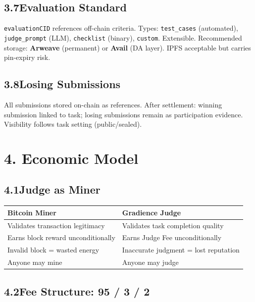 \documentclass[11pt,a4paper]{article}
\begin{document}
\subsection{3.7\quad Evaluation Standard}
\texttt{evaluationCID} references off-chain criteria. Types: \texttt{test\_cases} (automated), \texttt{judge\_prompt} (LLM), \texttt{checklist} (binary), \texttt{custom}. Extensible. Recommended storage: \textbf{Arweave} (permanent) or \textbf{Avail} (DA layer). IPFS acceptable but carries pin-expiry risk.

\subsection{3.8\quad Losing Submissions}
All submissions stored on-chain as references. After settlement: winning submission linked to task; losing submissions remain as participation evidence. Visibility follows task setting (public/sealed).

\section{4. Economic Model}

\subsection{4.1\quad Judge as Miner}

\begin{table}[H]\centering
\begin{tabular}{@{}ll@{}}
\toprule
\textbf{Bitcoin Miner} & \textbf{Gradience Judge} \\
\midrule
Validates transaction legitimacy & Validates task completion quality \\
Earns block reward unconditionally & Earns Judge Fee unconditionally \\
Invalid block = wasted energy & Inaccurate judgment = lost reputation \\
Anyone may mine & Anyone may judge \\
\bottomrule
\end{tabular}
\end{table}

\subsection{4.2\quad Fee Structure: 95 / 3 / 2}
\end{document}

